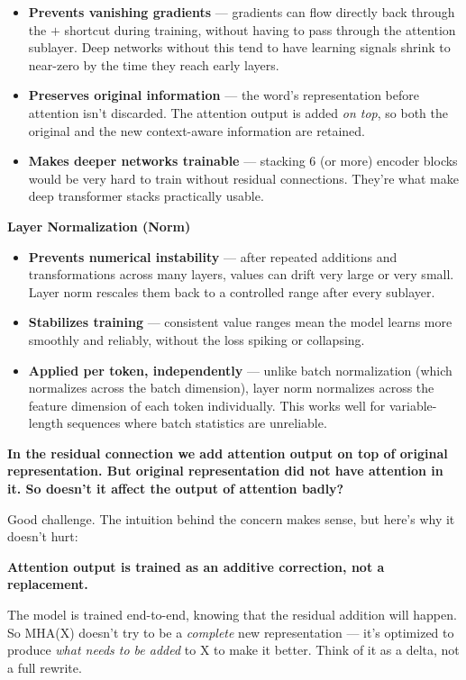 \begin{itemize}
    \item \textbf{Prevents vanishing gradients} --- gradients can flow directly back through the $+$ shortcut during training, without having to pass through the attention sublayer. Deep networks without this tend to have learning signals shrink to near-zero by the time they reach early layers.
    \item \textbf{Preserves original information} --- the word's representation before attention isn't discarded. The attention output is added \textit{on top}, so both the original and the new context-aware information are retained.
    \item \textbf{Makes deeper networks trainable} --- stacking 6 (or more) encoder blocks would be very hard to train without residual connections. They're what make deep transformer stacks practically usable.
\end{itemize}

\bigskip
\textbf{Layer Normalization (Norm)}

\begin{itemize}
    \item \textbf{Prevents numerical instability} --- after repeated additions and transformations across many layers, values can drift very large or very small. Layer norm rescales them back to a controlled range after every sublayer.
    \item \textbf{Stabilizes training} --- consistent value ranges mean the model learns more smoothly and reliably, without the loss spiking or collapsing.
    \item \textbf{Applied per token, independently} --- unlike batch normalization (which normalizes across the batch dimension), layer norm normalizes across the feature dimension of each token individually. This works well for variable-length sequences where batch statistics are unreliable.
\end{itemize}


\bigskip\bigskip
\textbf{In the residual connection we add attention output on top of original representation. But original representation did not have attention in it. So doesn't it affect the output of attention badly?}

Good challenge. The intuition behind the concern makes sense, but here's why it doesn't hurt:

\textbf{Attention output is trained as an additive correction, not a replacement.}

The model is trained end-to-end, knowing that the residual addition will happen. So MHA(X) doesn't try to be a \textit{complete} new representation --- it's optimized to produce \textit{what needs to be added} to X to make it better. Think of it as a delta, not a full rewrite.

